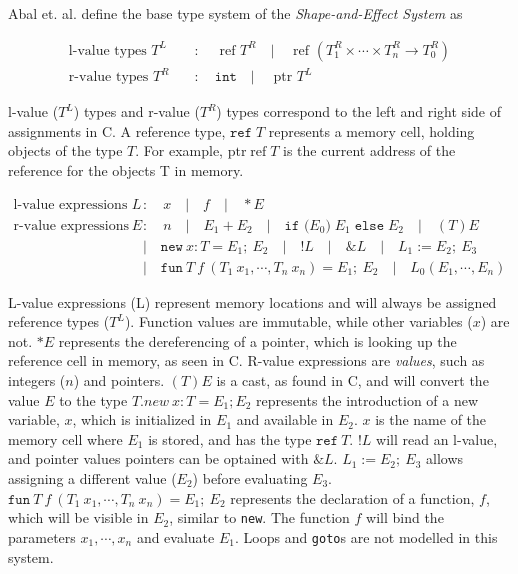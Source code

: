 \newpar Abal et. al. define the base type system of the \textit{Shape-and-Effect System} as 

\begin{equation*}
\begin{aligned}
    \text {l-value types } T^{L} \quad &: \quad \text{ ref } T^{R} \quad | \quad \text{ ref } \left(T_{1}^{R} \times \cdots \times T_{n}^{R} \rightarrow T_{0}^{R}\right)\\
    \text {r-value types } T^{R} \quad &: \quad \texttt{int} \quad | \quad \text{ ptr } T^{L}
\end{aligned}
\end{equation*}

\newpar l-value ($T^{L}$) types and r-value ($T^{R}$) types correspond to the left and right side of assignments in C. A reference type, $\texttt{ref} \; T$ represents a memory cell, holding objects of the type $T$. For example, $\text{ptr}\;\text{ref}\;T$ is the current address of the reference for the objects T in memory. 

\begin{equation*}
\begin{aligned}
    \text {l-value expressions } L \quad &: \quad x \quad | \quad f \quad | \quad *E \\
    \text{r-value expressions } E \quad &: \quad n \quad | \quad E_{1}+E_{2} \quad | \quad \texttt{if (}E_0\texttt{)} \; E_1 \; \texttt{else} \; E_2 \quad | \quad (T) E \\
    &| \quad \texttt{new} \: x : T=E_1 ;\: E_2 \quad | \quad !L \quad | \quad \& L \quad | \quad L_1 := E_2 ;\: E_3 \\
    &| \quad \texttt{fun} \:T\:f\:(T_1\:x_1, \cdots, T_n\:x_n) = E_1 ;\: E_2 \quad | \quad L_0(E_1, \cdots, E_n)
\end{aligned}
\end{equation*}

\newpar L-value expressions (L) represent memory locations and will always be assigned reference types ($T^L$). Function values are immutable, while other variables ($x$) are not. $*E$ represents the dereferencing of a pointer, which is looking up the reference cell in memory, as seen in C. R-value expressions are \textit{values}, such as integers ($n$) and pointers. $(T)E$ is a cast, as found in C, and will convert the value $E$ to the type $T$.$new\: x : T = E_1; E_2$ represents the introduction of a new variable, $x$, which is initialized in $E_1$ and available in $E_2$. $x$ is the name of the memory cell where $E_1$ is stored, and has the type $\texttt{ref} \:T$. $!L$ will read an l-value, and pointer values pointers can be optained with $\&L$.
$L_1 := E_2 ;\: E_3$ allows assigning a different value ($E_2$) before evaluating $E_3$. $\texttt{fun} \:T\:f\:(T_1\:x_1, \cdots, T_n\:x_n) = E_1 ;\: E_2$ represents the declaration of a function, $f$, which will be visible in $E_2$, similar to \texttt{new}. The function $f$ will bind the parameters $x_1, \cdots, x_n$ and evaluate $E_1$. Loops and \texttt{goto}s are not modelled in this system. 

